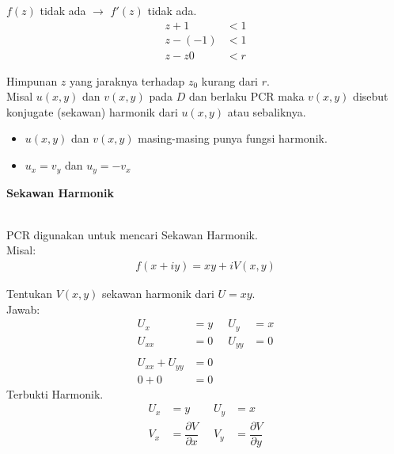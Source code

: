 \documentclass{article}
\begin{document}
$f(z)$ tidak ada $\rightarrow$ $f'(z)$ tidak ada.
\begin{align}
    z + 1    & < 1
    \nonumber      \\
    z - (-1) & < 1
    \nonumber      \\
    z - z0   & < r
    \nonumber
\end{align}

Himpunan $z$ yang jaraknya terhadap $z_0$ kurang dari $r$.
\\

Misal  $u(x,y)$ dan  $v(x,y)$ pada $D$ dan berlaku PCR maka $v(x,y)$ disebut konjugate (sekawan) harmonik dari $u(x,y)$ atau sebaliknya.
\begin{itemize}
    \item $u(x,y)$ dan $v(x,y)$ masing-masing punya fungsi harmonik.
    \item $u_x = v_y$ dan $u_y = -v_x$
\end{itemize}



\newpage
\begin{center}
    \textbf{Sekawan Harmonik}
\end{center}
\leavevmode\\

PCR digunakan untuk mencari Sekawan Harmonik.\\

Misal:
\begin{align}
    f(x + iy) = xy + iV(x, y)
    \nonumber
\end{align}

Tentukan $V(x,y)$ sekawan harmonik dari $U = xy$.\\
Jawab:
\begin{align}
    U_x           & = y    \; & \;   U_y    & = x
    \nonumber                                     \\
    U_{xx}        & = 0    \; & \;   U_{yy} & = 0
    \nonumber                                     \\\nonumber\\
    U_{xx}+U_{yy} & =0
    \nonumber                                     \\
    0 + 0         & =0
    \nonumber
\end{align}
Terbukti Harmonik.\\

\begin{align}
    U_x & = y                                \; & \;   U_y & = x
    \nonumber                                                                                 \\
    V_x & = \dfrac{\partial V}{\partial x}   \; & \;   V_y & = \dfrac{\partial V}{\partial y}
    \nonumber
\end{align}
\end{document}
